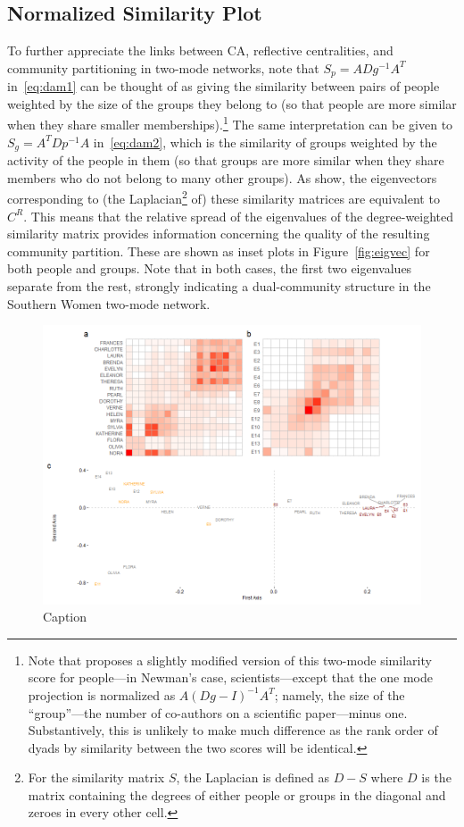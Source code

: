 \documentclass[a4paper,fleqn]{cas-sc}
\begin{document}
\subsection{Normalized Similarity Plot}
To further appreciate the links between CA, reflective centralities, and community partitioning in two-mode networks, note that $S_p = ADg^{-1}A^T$ in~\ref{eq:dam1} can be thought of as giving the similarity between pairs of people weighted by the size of the groups they belong to (so that people are more similar when they share smaller memberships).\footnote{Note that \citet[eq.2]{newman2001scientific} proposes a slightly modified version of this two-mode similarity score for people---in Newman's case, scientists---except that the one mode projection is normalized as $A(Dg - I)^{-1}A^T$; namely, the size of the ``group''---the number of co-authors on a scientific paper---minus one. Substantively, this is unlikely to make much difference as the rank order of dyads by similarity between the two scores will be identical.} The same interpretation can be given to $S_g = A^TDp^{-1}A$ in~\ref{eq:dam2}, which is the similarity of groups weighted by the activity of the people in them (so that groups are more similar when they share members who do not belong to many other groups). As \citet{van2021correspondence} show, the eigenvectors corresponding to (the Laplacian\footnote{For the similarity matrix $S$, the Laplacian is defined as $D-S$ where $D$ is the matrix containing the degrees of either people or groups in the diagonal and zeroes in every other cell.} of) these similarity matrices are equivalent to $C^R$. This means that the relative spread of the eigenvalues of the degree-weighted similarity matrix provides information concerning the quality of the resulting community partition. These are shown as inset plots in Figure~\ref{fig:eigvec} for both people and groups. Note that in both cases, the first two eigenvalues separate from the rest, strongly indicating a dual-community structure in the Southern Women two-mode network. 

\begin{figure}
    \centering
    \includegraphics[width=1.0\textwidth]{Plots/ca-sim.png}
    \caption{Caption}
    \label{fig:ca-sim}
\end{figure}
\end{document}
